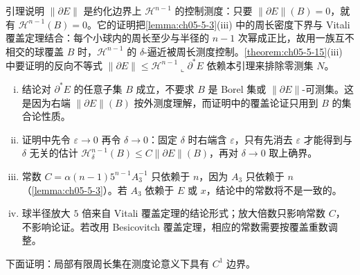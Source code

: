 \documentclass[../../main.tex]{subfiles}%
\begin{document}
\begin{remark}\label{remark:ch05-lem-5-4-动机}
引理说明 $\lVert\partial E\rVert$ 是约化边界上 $\mathcal{H}^{n-1}$ 的控制测度：只要 $\lVert\partial E\rVert(B)=0$，就有 $\mathcal{H}^{n-1}(B)=0$。它的证明把\cref{lemma:ch05-5-3}(iii) 中的周长密度下界与 Vitali 覆盖定理结合：每个小球内的周长至少与半径的 $n-1$ 次幂成正比，故用一族互不相交的球覆盖 $B$ 时，$\mathcal{H}^{n-1}$ 的 $\delta$-逼近被周长测度控制。\cref{theorem:ch05-5-15}(iii) 中要证明的反向不等式 $\lVert\partial E\rVert\leqslant\mathcal{H}^{n-1}\llcorner\partial^*E$ 依赖本引理来排除零测集 $N$。%
\end{remark}

\begin{remark}\label{remark:ch05-lem-5-4-条件}
\begin{enumerate}[(i)]
\item 结论对 $\partial^*E$ 的任意子集 $B$ 成立，不要求 $B$ 是 Borel 集或 $\lVert\partial E\rVert$-可测集。这是因为右端 $\lVert\partial E\rVert(B)$ 按外测度理解，而证明中的覆盖论证只用到 $B$ 的集合论性质。
\item 证明中先令 $\varepsilon\to0$ 再令 $\delta\to0$：固定 $\delta$ 时右端含 $\varepsilon$，只有先消去 $\varepsilon$ 才能得到与 $\delta$ 无关的估计 $\mathcal{H}^{n-1}_{\delta}(B)\leqslant C\lVert\partial E\rVert(B)$，再对 $\delta\to0$ 取上确界。
\item 常数 $C=\alpha(n-1)5^{n-1}A_3^{-1}$ 只依赖于 $n$，因为 $A_3$ 只依赖于 $n$（\cref{lemma:ch05-5-3}）。若 $A_3$ 依赖于 $E$ 或 $x$，结论中的常数将不是一致的。%
\item 球半径放大 $5$ 倍来自 Vitali 覆盖定理的结论形式；放大倍数只影响常数 $C$，不影响论证。若改用 Besicovitch 覆盖定理，相应的常数需要按覆盖重数调整。
\end{enumerate}
\end{remark}

下面证明：局部有限周长集在测度论意义下具有 $C^1$ 边界。
\end{document}
